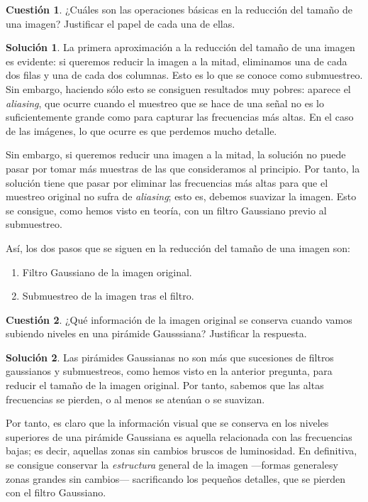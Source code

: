 \documentclass[a4paper, 11pt]{article}
\theoremstyle{definition}
\newtheorem*{solucion}{Solución}
\theoremstyle{theorem}
\newtheorem{cuestion}{Cuestión}
\begin{document}
  \begin{cuestion}
      ¿Cuáles son las operaciones básicas en la reducción del tamaño de una imagen? Justificar el papel de cada una de ellas.
  \end{cuestion}

  \begin{solucion}
      La primera aproximación a la reducción del tamaño de una imagen es evidente: si queremos reducir la imagen a la mitad, eliminamos una de cada dos filas y una de cada dos columnas. Esto es lo que se conoce como submuestreo. Sin embargo, haciendo sólo esto se consiguen resultados muy pobres: aparece el \emph{aliasing}, que ocurre cuando el muestreo que se hace de una señal no es lo suficientemente grande como para capturar las frecuencias más altas. En el caso de las imágenes, lo que ocurre es que perdemos mucho detalle.

      Sin embargo, si queremos reducir una imagen a la mitad, la solución no puede pasar por tomar más muestras de las que consideramos al principio. Por tanto, la solución tiene que pasar por eliminar las frecuencias más altas para que el muestreo original no sufra de \emph{aliasing}; esto es, debemos suavizar la imagen. Esto se consigue, como hemos visto en teoría, con un filtro Gaussiano previo al submuestreo.

      Así, los dos pasos que se siguen en la reducción del tamaño de una imagen son:
      \begin{enumerate}
          \item Filtro Gaussiano de la imagen original.
          \item Submuestreo de la imagen tras el filtro.
      \end{enumerate}
  \end{solucion}

  \begin{cuestion}
      ¿Qué información de la imagen original se conserva cuando vamos subiendo niveles en una pirámide Gausssiana? Justificar la respuesta.
  \end{cuestion}

  \begin{solucion}
      Las pirámides Gaussianas no son más que sucesiones de filtros gaussianos y submuestreos, como hemos visto en la anterior pregunta, para reducir el tamaño de la imagen original. Por tanto, sabemos que las altas frecuencias se pierden, o al menos se atenúan o se suavizan.

      Por tanto, es claro que la información visual que se conserva en los niveles superiores de una pirámide Gaussiana es aquella relacionada con las frecuencias bajas; es decir, aquellas zonas sin cambios bruscos de luminosidad. En definitiva, se consigue conservar la \emph{estructura} general de la imagen ---formas generalesy  zonas grandes sin cambios--- sacrificando los pequeños detalles, que se pierden con el filtro Gaussiano.
  \end{solucion}
\end{document}
